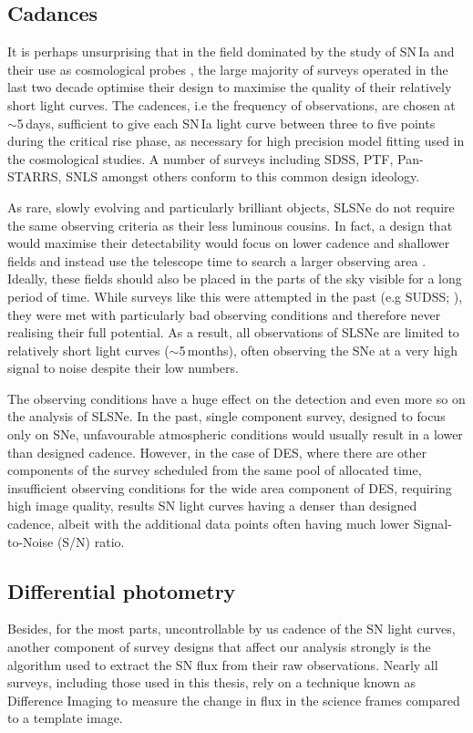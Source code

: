 \subsection{Cadances}
It is perhaps unsurprising that in the field dominated by the study of SN\,Ia and their use as cosmological probes \citep{Perlmutter1997,Riess1998}, the large majority of surveys operated in the last two decade optimise their design to maximise the quality of their relatively short light curves. The cadences, i.e the frequency of observations, are chosen at $\sim$5\,days, sufficient to give each SN\,Ia light curve between three to five points during the critical rise phase, as necessary for high precision model fitting used in the cosmological studies. A number of surveys including SDSS, PTF, Pan-STARRS, SNLS amongst others conform to this common design ideology.

As rare, slowly evolving and particularly brilliant objects, SLSNe do not require the same observing criteria as their less luminous cousins. In fact, a design that would maximise their detectability would focus on lower cadence and shallower fields and instead use the telescope time to search a larger observing area \citep{Scovacricchi2016}. Ideally, these fields should also be placed in the parts of the sky visible for a long period of time. While surveys like this were attempted in the past (e.g SUDSS; ), they were met with particularly bad observing conditions and therefore never realising their full potential. As a result, all observations of SLSNe are limited to relatively short light curves ($\sim$5\,months), often observing the SNe at a very high signal to noise despite their low numbers.

The observing conditions have a huge effect on the detection and even more so on the analysis of SLSNe. In the past, single component survey, designed to focus only on SNe, unfavourable atmospheric conditions would usually result in a lower than designed cadence. However, in the case of DES, where there are other components of the survey scheduled from the same pool of allocated time, insufficient observing conditions for the wide area component of DES, requiring high image quality, results SN light curves having a denser than designed cadence, albeit with the additional data points often having much lower Signal-to-Noise (S/N) ratio.

\subsection{Differential photometry}
Besides, for the most parts, uncontrollable by us cadence of the SN light curves, another component of survey designs that affect our analysis strongly is the algorithm used to extract the SN flux from their raw observations. Nearly all surveys, including those used in this thesis, rely on a technique known as Difference Imaging \citep{Alard1997} to measure the change in flux in the science frames compared to a template image.

